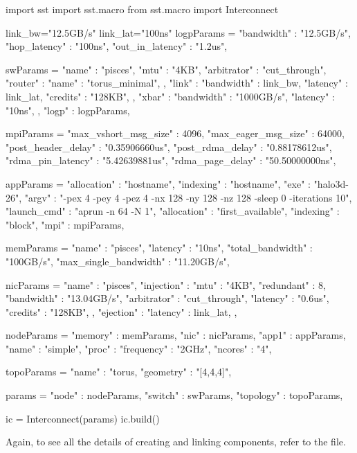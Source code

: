 \begin{ViFile}
import sst
import sst.macro
from sst.macro import Interconnect

link_bw="12.5GB/s"
link_lat="100ns"
logpParams = {
  "bandwidth" : "12.5GB/s",
  "hop_latency" : "100ns",
  "out_in_latency" : "1.2us",
}

swParams = {
  "name" : "pisces",
  "mtu" : "4KB",
  "arbitrator" : "cut_through",
  "router" : {
    "name"     :     "torus_minimal",
  },
  "link" : {
    "bandwidth" : link_bw,
    "latency" : link_lat,
    "credits" : "128KB",
  },
  "xbar" : {
    "bandwidth" : "1000GB/s",
    "latency" : "10ns",
  },
  "logp" : logpParams,
}

mpiParams = {
 "max_vshort_msg_size" : 4096,
 "max_eager_msg_size" : 64000,
 "post_header_delay" : "0.35906660us",
 "post_rdma_delay" : "0.88178612us",
 "rdma_pin_latency" : "5.42639881us",
 "rdma_page_delay" : "50.50000000ns",
}

appParams = {
  "allocation" : "hostname",
  "indexing" : "hostname",
  "exe" : "halo3d-26",
  "argv" : "-pex 4 -pey 4 -pez 4 -nx 128 -ny 128 -nz 128 -sleep 0 -iterations 10",
  "launch_cmd" : "aprun -n 64 -N 1",
  "allocation" : "first_available",
  "indexing" : "block",
  "mpi" : mpiParams,
}

memParams = {
 "name" : "pisces",
 "latency" : "10ns",
 "total_bandwidth" : "100GB/s",
 "max_single_bandwidth" : "11.20GB/s",
}

nicParams = {
  "name" : "pisces",
  "injection" : {
    "mtu" : "4KB",
    "redundant" : 8,
    "bandwidth" : "13.04GB/s",
    "arbitrator" : "cut_through",
    "latency" : "0.6us",
    "credits" : "128KB",
  },
  "ejection" : {
    "latency" : link_lat,
  },  
}

nodeParams = {
  "memory" : memParams,
  "nic" : nicParams,
  "app1" : appParams,
  "name" : "simple",
  "proc" : {
    "frequency" : "2GHz",
    "ncores" : "4",
  }
}

topoParams = {
 "name" : "torus,
 "geometry" : "[4,4,4]",
}

params = {
  "node" : nodeParams,
  "switch" : swParams,
  "topology" : topoParams,
}

ic = Interconnect(params)
ic.build()
\end{ViFile}

Again, to see all the details of creating and linking components, refer to the  file.


